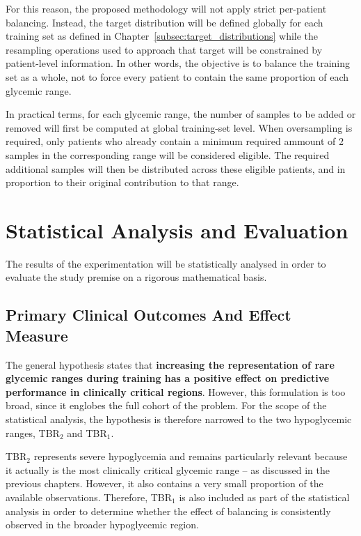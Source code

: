 For this reason, the proposed methodology will not apply strict per-patient balancing. Instead, the target distribution will be defined globally for each training set as defined in Chapter~\ref{subsec:target_distributions} while the resampling operations used to approach that target will be constrained by patient-level information. In other words, the objective is to balance the training set as a whole, not to force every patient to contain the same proportion of each glycemic range.

In practical terms, for each glycemic range, the number of samples to be added or removed will first be computed at global training-set level. When oversampling is required, only patients who already contain a minimum required ammount of 2 samples in the corresponding range will be considered eligible. The required additional samples will then be distributed across these eligible patients, and in proportion to their original contribution to that range.

\section{Statistical Analysis and Evaluation}
\label{sec:statistical_analysis}

The results of the experimentation will be statistically analysed in order to evaluate the study premise on a rigorous mathematical basis.

\subsection{Primary Clinical Outcomes And Effect Measure}
\label{subsec:primary_clinical_outcome}

The general hypothesis states that \textbf{increasing the representation of rare glycemic ranges during training has a positive effect on predictive performance in clinically critical regions}. However, this formulation is too broad, since it englobes the full cohort of the problem. For the scope of the statistical analysis, the hypothesis is therefore narrowed to the two hypoglycemic ranges, TBR$_2$ and TBR$_1$.

TBR$_2$ represents severe hypoglycemia and remains particularly relevant because it actually is the most clinically critical glycemic range -- as discussed in the previous chapters. However, it also contains a very small proportion of the available observations. Therefore, TBR$_1$ is also included as part of the statistical analysis in order to determine whether the effect of balancing is consistently observed in the broader hypoglycemic region.

